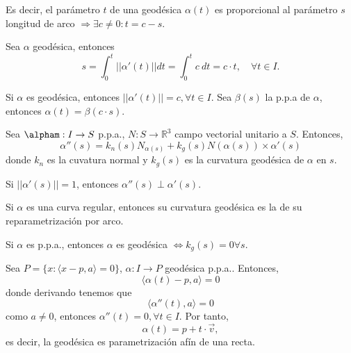 \begin{obs}
  Es decir, el parámetro $t$ de una geodésica $\alpha(t)$ es proporcional al parámetro $s$ longitud de arco $\Rightarrow \exists c \neq 0 : t = c - s$.
\end{obs}

\begin{dem}
  Sea $\alpha$ geodésica, entonces
  \[ 
    s = \int_{0}^{t} ||\alpha'(t)|| dt = \int_{0}^{t} c \ dt = c \cdot t, \quad \forall t \in I.
  \] 
\end{dem}

\begin{obs}
  Si $\alpha$ es geodésica, entonces $||\alpha'(t)|| = c, \forall t \in I$. Sea $\beta(s)$ la p.p.a de $\alpha$, entonces $\alpha(t) = \beta(c \cdot s)$.
\end{obs}

\begin{defn}
  Sea $\alpham : I \to S$ p.p.a., $N : S \to \mathbb{R}^{3}$ campo vectorial unitario a $S$. Entonces,
  \[
    \alpha''(s) = k_{n}(s) N_{\alpha(s)} + k_{g}(s) N(\alpha(s)) \times \alpha'(s)
  \]
  donde $k_{n}$ es la cuvatura normal y $k_{g}(s)$ es la curvatura geodésica de $\alpha$ en $s$.
\end{defn}

\begin{obs}
  Si $||\alpha'(s)|| = 1$, entonces $\alpha''(s) \perp \alpha'(s)$.
\end{obs}

\begin{defn}
  Si $\alpha$ es una curva regular, entonces su curvatura geodésica es la de su reparametrización por arco.
\end{defn}

\begin{obs}
  Si $\alpha$ es p.p.a., entonces $\alpha$ es geodésica $\Leftrightarrow k_{g}(s) = 0 \forall s$.
\end{obs}

\begin{ejm}[Plano]
  Sea $P = \{ x : \langle x-p{ , }a \rangle = 0 \}$, $\alpha : I \to P$ geodésica p.p.a.. Entonces,
  \[ 
    \langle \alpha(t) - p{ , }a \rangle = 0
  \] 
  donde derivando tenemos que
  \[ 
    \langle \alpha''(t){ , }a \rangle = 0 
  \] 
  como $a \neq 0$, entonces $\alpha''(t) = 0, \forall t \in I$. Por tanto,
  \[ 
    \alpha(t) = p + t \cdot \vec{v},
  \] 
  es decir, la geodésica es parametrización afín de una recta.
\end{ejm}

